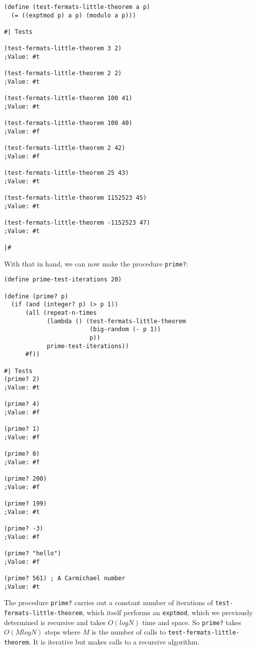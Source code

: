 \documentclass[12pt]{article}
\begin{document}
\begin{verbatim}
(define (test-fermats-little-theorem a p)
  (= ((exptmod p) a p) (modulo a p)))

#| Tests

(test-fermats-little-theorem 3 2)
;Value: #t

(test-fermats-little-theorem 2 2)
;Value: #t

(test-fermats-little-theorem 100 41)
;Value: #t

(test-fermats-little-theorem 100 40)
;Value: #f

(test-fermats-little-theorem 2 42)
;Value: #f

(test-fermats-little-theorem 25 43)
;Value: #t

(test-fermats-little-theorem 1152523 45)
;Value: #t

(test-fermats-little-theorem -1152523 47)
;Value: #t

|#
\end{verbatim}

With that in hand, we can now make the procedure \texttt{prime?}:

\begin{verbatim}
(define prime-test-iterations 20)

(define (prime? p)
  (if (and (integer? p) (> p 1))
      (all (repeat-n-times
            (lambda () (test-fermats-little-theorem
                        (big-random (- p 1))
                        p))
            prime-test-iterations))
      #f))

#| Tests
(prime? 2)
;Value: #t

(prime? 4)
;Value: #f

(prime? 1)
;Value: #f

(prime? 0)
;Value: #f

(prime? 200)
;Value: #f

(prime? 199)
;Value: #t

(prime? -3)
;Value: #f

(prime? "hello")
;Value: #f

(prime? 561) ; A Carmichael number
;Value: #t

\end{verbatim}

The procedure \texttt{prime?} carries out a constant number of iterations
of \texttt{test-fermats-little-theorem}, which itself performs an \texttt{exptmod},
which we previously determined is recursive and takes $O(logN)$ time
and space. So \texttt{prime?} takes $O(MlogN)$ steps where $M$ is the number
of calls to \texttt{test-fermats-little-theorem}. It is iterative but makes
calls to a recursive algorithm.
\end{document}
